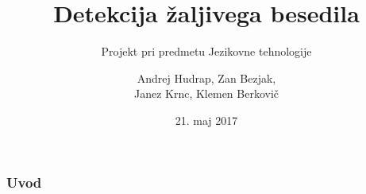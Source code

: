 \documentclass[11pt]{beamer}
\begin{document}
	\author{Andrej Hudrap, Zan Bezjak,\\ Janez Krnc, Klemen Berkovič}
	\title{Detekcija žaljivega besedila}
	\subtitle{Projekt pri predmetu Jezikovne tehnologije}
	\date{21. maj 2017}
	\begin{frame}[plain]
		\maketitle
	\end{frame}

	\begin{frame}[plain]
		\frametitle{Uvod}
	\end{frame}
\end{document}
